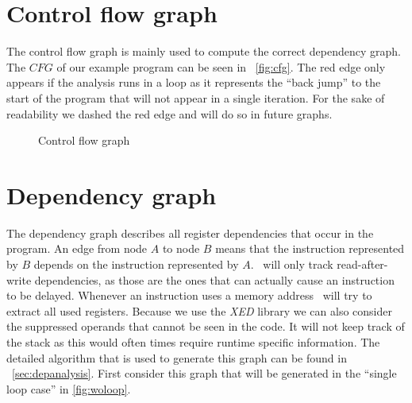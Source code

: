 \section{Control flow graph}
The control flow graph is mainly used to compute the correct dependency graph. The $CFG$ of our example program can be seen in ~\autoref{fig:cfg}. The red edge only appears if the analysis runs in a loop as it represents the ``back jump'' to the start of the program that will not appear in a single iteration. For the sake of readability we dashed the red edge and will do so in future graphs.

\begin{figure}
    \centering
    \caption{Control flow graph}
    \label{fig:cfg}
\end{figure}

\FloatBarrier

\section{Dependency graph}
The dependency graph describes all register dependencies that occur in the program. An edge from node $A$ to node $B$ means that the instruction represented by $B$ depends on the instruction represented by $A$. \suaca\ will only track read-after-write dependencies, as those are the ones that can actually cause an instruction to be delayed. Whenever an instruction uses a memory address \suaca\ will try to extract all used registers. Because we use the \emph{XED} library \cite{xed} we can also consider the suppressed operands that cannot be seen in the code. It will not keep track of the stack as this would often times require runtime specific information. The detailed algorithm that is used to generate this graph can be found in ~\autoref{sec:depanalysis}. First consider this graph that will be generated in the ``single loop case'' in \autoref{fig:woloop}.\\


